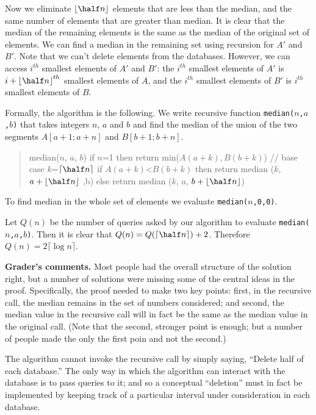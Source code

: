 \documentclass[12pt]{article}
\newcommand{\cel}[1]{
{\lceil {#1} \rceil}
}
\newcommand{\flr}[1]{
{\lfloor {#1} \rfloor}
}
\begin{document}
\begin{enumerate}
{Now we eliminate $\flr{\half n}$ elements that are less than the median,
and the same number of elements that are greater than median.
It is clear that the
median of the remaining elements is the same as
the median of the original set of
elements.
We can find a median in the remaining set
using recursion for $A'$ and $B'$.
Note that we can't delete elements from the databases.
However, we can access $i^{th}$ smallest elements of $A'$ and $B'$:
the $i^{th}$ smallest elements of $A'$ is $i+\flr{\half n }^{th}$ smallest
elements of $A$, and
the $i^{th}$ smallest elements of $B'$ is $i^{th}$ smallest
elements of $B$.

Formally, the algorithm is the following.
We write recursive function {\tt median($n$,$a$,$b$)}
that takes integers $n$, $a$ and $b$  and
find the median of the union of the two segments $A[a+1; a+n]$ and
$B[b+1; b+n]$.

\begin{quote}
\begin{code}
median($n$, $a$, $b$)
   if $n$=1 then return min($A(a+k),B(b+k)$) // base case
   $k$=$\cel{\half n }$
   if $A(a+k)$<$B(b+k)$
     then return median ($k$, $a+\flr{\half n }$ ,b)
     else return median ($k$, $a$, $b+\flr{\half n }$)
\end{code}
\end{quote}

To find median in the whole set of elements we evaluate
{\tt median($n$,0,0)}.

Let $Q(n)$ be the number of queries asked by our algorithm to evaluate
{\tt median($n$,$a$,$b$)}.
Then it is clear that $Q(n)=Q(\cel{\half n })+2$.
Therefore $Q(n)=2\cel{\log n}$.

\bigskip

\noindent
{\bf Grader's comments.}
Most people had the overall structure of the solution right,
but a number of solutions were missing some of the central
ideas in the proof.  Specifically, the proof needed to
make two key points: first, in the recursive call, the
median remains in the set of numbers considered;
and second, the median value in the recursive call
will in fact be the same as the median value in
the original call.  (Note that the second, stronger point is
enough; but a number of people made the only the first
poin and not the second.)

The algorithm cannot invoke the recursive call by
simply saying, ``Delete half of each database.''  The only way
in which the algorithm can interact with the database is
to pass queries to it; and so a conceptual ``deletion''
must in fact be implemented by keeping track of a particular
interval under consideration in each database.

}
\end{enumerate}
\end{document}
